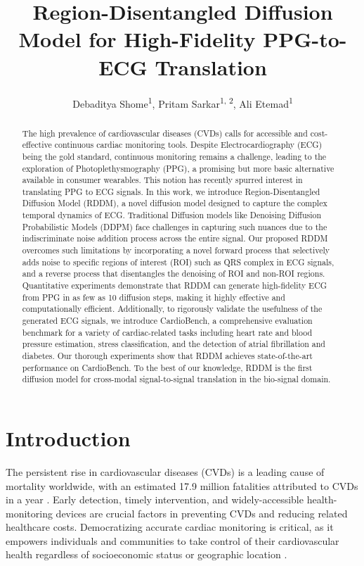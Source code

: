 \documentclass[letterpaper]{article} %
\title{Region-Disentangled Diffusion Model for High-Fidelity PPG-to-ECG Translation}
\author{
    Debaditya Shome\textsuperscript{\rm 1},
    Pritam Sarkar\textsuperscript{\rm 1, \rm 2},
    Ali Etemad\textsuperscript{\rm 1}
}
\begin{document}
\maketitle

\begin{abstract}
The high prevalence of cardiovascular diseases (CVDs) calls for accessible and cost-effective continuous cardiac monitoring tools. Despite Electrocardiography (ECG) being the gold standard, continuous monitoring remains a challenge, leading to the exploration of Photoplethysmography (PPG), a promising but more basic alternative available in consumer wearables. This notion has recently spurred interest in translating PPG to ECG signals. In this work, we introduce Region-Disentangled Diffusion Model (RDDM), a novel diffusion model designed to capture the complex temporal dynamics of ECG. Traditional Diffusion models like Denoising Diffusion Probabilistic Models (DDPM) face challenges in capturing such nuances due to the indiscriminate noise addition process across the entire signal. Our proposed RDDM overcomes such limitations by incorporating a novel forward process that selectively adds noise to specific regions of interest (ROI) such as QRS complex in ECG signals, and a reverse process that disentangles the denoising of ROI and non-ROI regions.
Quantitative experiments demonstrate that RDDM can generate high-fidelity ECG from PPG in as few as 10 diffusion steps, making it highly effective and computationally efficient.
Additionally, to rigorously validate the usefulness of the generated ECG signals, we introduce CardioBench, a comprehensive evaluation benchmark for a variety of cardiac-related tasks including heart rate and blood pressure estimation, stress classification,  and the detection of atrial fibrillation and diabetes. Our thorough experiments show that RDDM achieves state-of-the-art performance on CardioBench. To the best of our knowledge, RDDM is the first diffusion model for cross-modal signal-to-signal translation in the bio-signal domain.
\end{abstract}


\section{Introduction}

The persistent rise in cardiovascular diseases (CVDs) is a leading cause of mortality worldwide, with an estimated 17.9 million fatalities attributed to CVDs in a year \cite{kauffman2020cardiovascular}. Early detection, timely intervention, and widely-accessible health-monitoring devices are crucial factors in preventing CVDs and reducing related healthcare costs. Democratizing accurate cardiac monitoring is critical, as it empowers individuals and communities to take control of their cardiovascular health regardless of socioeconomic status or geographic location \cite{bayoumy2021smart}.
\end{document}
